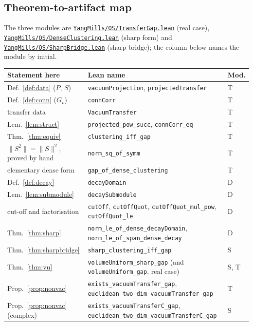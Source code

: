 \documentclass[11pt]{article}
\theoremstyle{definition}
\newcommand{\lean}[1]{\texttt{#1}}
\newcommand{\anchor}{ad9c93d793fa0b082f2373c2aea3ea5b99f9c6b8}
\newcommand{\osfile}[2]{%
  \href{https://github.com/lluiseriksson/THE-ERIKSSON-PROGRAMME/blob/\anchor/YangMills/OS/#1.lean}{\nolinkurl{#2}}}
\begin{document}
\subsection*{Theorem-to-artifact map}

The three modules are
\osfile{TransferGap}{YangMills/OS/TransferGap.lean} (real case),
\osfile{DenseClustering}{YangMills/OS/DenseClustering.lean} (sharp form)
and \osfile{SharpBridge}{YangMills/OS/SharpBridge.lean} (sharp bridge);
the column below names the module by initial.

\small
\begin{longtable}{@{}>{\raggedright\arraybackslash}p{} >{\raggedright\arraybackslash}p{} l@{}}
\toprule
Statement here & Lean name & Mod. \\
\midrule
\endhead
Def.~\ref{def:data} ($P$, $S$) & \lean{vacuumProjection},
  \lean{projectedTransfer} & T \\
Def.~\ref{def:conn} ($G_v$) & \lean{connCorr} & T \\
transfer data & \lean{VacuumTransfer} & T \\
Lem.~\ref{lem:struct} & \lean{projected\_pow\_succ},
  \lean{connCorr\_eq} & T \\
Thm.~\ref{thm:equiv} & \lean{clustering\_iff\_gap} & T \\
$\|S^2\|=\|S\|^2$, proved by hand & \lean{norm\_sq\_of\_symm} & T \\
elementary dense form & \lean{gap\_of\_dense\_clustering} & T \\
Def.~\ref{def:decay} & \lean{decayDomain} & D \\
Lem.~\ref{lem:submodule} & \lean{decaySubmodule} & D \\
cut-off and factorisation & \lean{cutOff}, \lean{cutOffQuot},
  \lean{cutOffQuot\_mul\_pow}, \lean{cutOffQuot\_le} & D \\
Thm.~\ref{thm:sharp} & \lean{norm\_le\_of\_dense\_decayDomain},
  \lean{norm\_le\_of\_span\_dense\_decay} & D \\
Thm.~\ref{thm:sharpbridge} & \lean{sharp\_clustering\_iff\_gap} & S \\
Thm.~\ref{thm:vu} & \lean{volumeUniform\_sharp\_gap} (and
  \lean{volumeUniform\_gap}, real case) & S, T \\
Prop.~\ref{prop:nonvac} & \lean{exists\_vacuumTransfer\_gap},
  \lean{euclidean\_two\_dim\_vacuumTransfer\_gap} & T \\
Prop.~\ref{prop:nonvac} (complex) & \lean{exists\_vacuumTransferC\_gap},
  \lean{euclidean\_two\_dim\_vacuumTransferC\_gap} & S \\
\bottomrule
\end{longtable}
\normalsize
\end{document}
